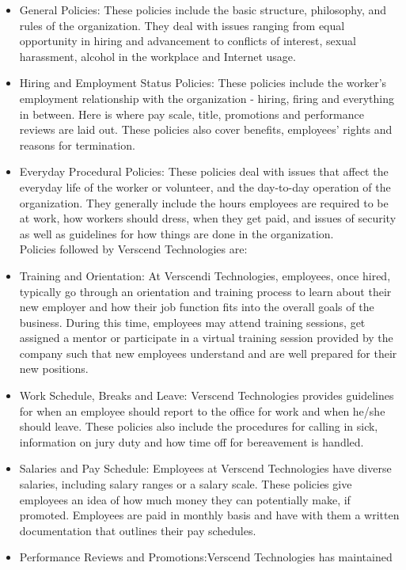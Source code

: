 \begin{itemize}
\item
General Policies: These policies include the basic structure, philosophy, and rules of the organization.
They deal with issues ranging from equal opportunity in hiring and advancement to conflicts of
interest, sexual harassment, alcohol in the workplace and Internet usage.
\item
Hiring and Employment Status Policies: These policies include the worker's employment
relationship with the organization - hiring, firing and everything in between. Here is where pay scale,
title, promotions and performance reviews are laid out. These policies also cover benefits, employees'
rights and reasons for termination.
\item
Everyday Procedural Policies: These policies deal with issues that affect the everyday life of the
worker or volunteer, and the day-to-day operation of the organization. They generally include the
hours employees are required to be at work, how workers should dress, when they get paid, and issues
of security as well as guidelines for how things are done in the organization.\\
Policies followed by Verscend Technologies are:
\item
Training and Orientation: At Verscendi Technologies, employees, once hired, typically go
through an orientation and training process to learn about their new employer and how their job
function fits into the overall goals of the business. During this time, employees may attend training
sessions, get assigned a mentor or participate in a virtual training session provided by the company
such that new employees understand and are well prepared for their new positions.
\item
Work Schedule, Breaks and Leave: Verscend Technologies provides guidelines for when
an employee should report to the office for work and when he/she should leave. These policies also
include the procedures for calling in sick, information on jury duty and how time off for bereavement
is handled.
\item
Salaries and Pay Schedule: Employees at Verscend Technologies have diverse salaries,
including salary ranges or a salary scale. These policies give employees an idea of how much money
they can potentially make, if promoted. Employees are paid in monthly basis and have with them
a
written documentation that outlines their pay schedules.
\item
Performance Reviews and Promotions:Verscend Technologies has maintained

\end{itemize}
